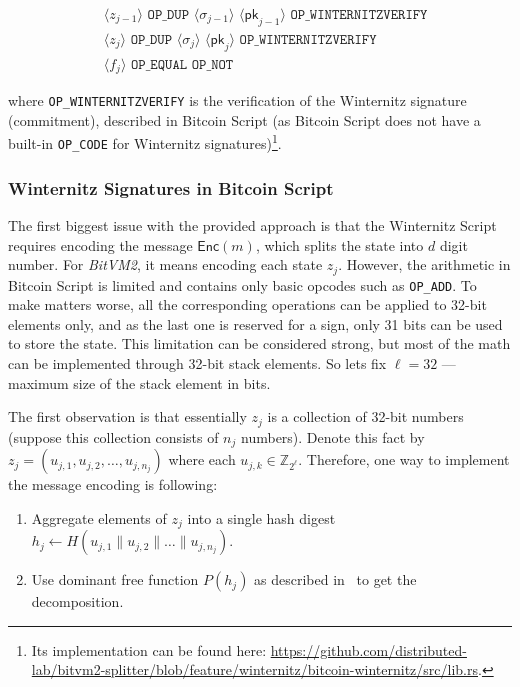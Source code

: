 \documentclass{iacrtrans}
\newcommand{\elem}[1]{\, \langle #1 \rangle \,}
\newcommand{\opcode}[1]{\, \texttt{#1} \,}
\begin{document}
\begin{empheqboxed}
  \begin{align*}
    &\elem{z_{j-1}} \opcode{OP\_DUP} \elem{\sigma_{j-1}}
    \elem{\mathsf{pk}_{j-1}} \opcode{OP\_WINTERNITZVERIFY} \\
    &\elem{z_{j}} \opcode{OP\_DUP} \elem{\sigma_{j}}
    \elem{\mathsf{pk}_{j}} \opcode{OP\_WINTERNITZVERIFY} \\
    &\elem{f_j} \opcode{OP\_EQUAL} \opcode{OP\_NOT}
  \end{align*}
\end{empheqboxed}

where \texttt{OP\_WINTERNITZVERIFY} is the verification of the
Winternitz signature (commitment), described in Bitcoin Script (as
Bitcoin Script does not have a built-in \texttt{OP\_CODE} for
Winternitz signatures)\footnote{Its implementation can be found here:
  \url{https://github.com/distributed-lab/bitvm2-splitter/blob/feature/winternitz/bitcoin-winternitz/src/lib.rs}.}.

\subsubsection{Winternitz Signatures in Bitcoin
Script}\label{sec:winternitz-in-bitcoin-script}

The first biggest issue with the provided approach is that the Winternitz Script
requires encoding the message $\mathsf{Enc}(m)$, which splits the state into $d$
digit number. For \textit{BitVM2}, it means encoding each state
$z_j$. However, the
arithmetic in Bitcoin Script is limited and contains only basic opcodes such as
\texttt{OP\_ADD}. To make matters worse, all the corresponding operations can be
applied to 32-bit elements only, and as the last one is reserved for a sign,
only 31 bits can be used to store the state. This limitation can be considered
strong, but most of the math can be implemented through 32-bit stack elements.
So lets fix $\ell = 32$ --- maximum size of the stack element in bits.

The first observation is that essentially $z_j$ is a collection of
32-bit numbers (suppose this collection consists of $n_j$ numbers).
Denote this fact by $z_j = (u_{j,1}, u_{j,2}, \dots, u_{j, n_j})$
where each $u_{j,k} \in \mathbb{Z}_{2^{\ell}}$. Therefore, one way to
implement the message encoding is following:
\begin{enumerate}
  \item Aggregate elements of $z_j$ into a single hash digest $h_j \gets
    H(u_{j,1} \parallel u_{j,2} \parallel \dots \parallel u_{j,n_j})$.
  \item Use dominant free function $P(h_j)$ as described
    in~\cite{applied-crypto} to get the decomposition.
\end{enumerate}
\end{document}
